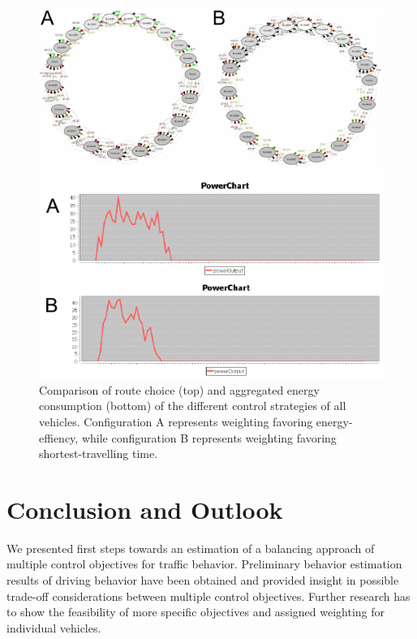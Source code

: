 \documentclass[conference]{../cls/IEEEtran}
\begin{document}
\begin{figure}[t!]
	\includegraphics[width=\columnwidth]{../gfx/results.pdf}
	\caption{Comparison of route choice (top) and aggregated energy consumption
	(bottom) of the different control strategies of all vehicles. Configuration A
	represents weighting favoring energy-effiency, while configuration B represents
	weighting favoring shortest-travelling time.}
	\label{figure:results}
\end{figure}


\section{Conclusion and Outlook}

We presented first steps towards an estimation of a balancing
approach of multiple control objectives for traffic behavior.
Preliminary behavior estimation results of driving behavior have been obtained and provided insight 
in possible trade-off considerations between multiple control objectives.
Further research has to show the feasibility of more specific objectives and
assigned weighting for individual vehicles. 



\end{document}
